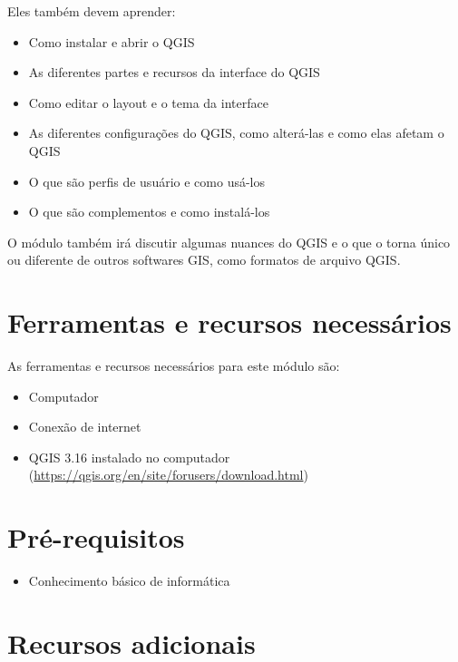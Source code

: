 \documentclass[
]{book}
\providecommand{\tightlist}{%
  \setlength{\itemsep}{0pt}\setlength{\parskip}{0pt}}
\begin{document}
Eles também devem aprender:

\begin{itemize}
\tightlist
\item
  Como instalar e abrir o QGIS
\item
  As diferentes partes e recursos da interface do QGIS
\item
  Como editar o layout e o tema da interface
\item
  As diferentes configurações do QGIS, como alterá-las e como elas afetam o QGIS
\item
  O que são perfis de usuário e como usá-los
\item
  O que são complementos e como instalá-los
\end{itemize}

O módulo também irá discutir algumas nuances do QGIS e o que o torna único ou diferente de outros softwares GIS, como formatos de arquivo QGIS.

\hypertarget{ferramentas-e-recursos-necessuxe1rios-1}{%
\section{Ferramentas e recursos necessários}\label{ferramentas-e-recursos-necessuxe1rios-1}}

As ferramentas e recursos necessários para este módulo são:

\begin{itemize}
\tightlist
\item
  Computador
\item
  Conexão de internet
\item
  QGIS 3.16 instalado no computador (\url{https://qgis.org/en/site/forusers/download.html})
\end{itemize}

\hypertarget{pruxe9-requisitos-1}{%
\section{Pré-requisitos}\label{pruxe9-requisitos-1}}

\begin{itemize}
\tightlist
\item
  Conhecimento básico de informática
\end{itemize}

\hypertarget{recursos-adicionais-1}{%
\section{Recursos adicionais}\label{recursos-adicionais-1}}
\end{document}
